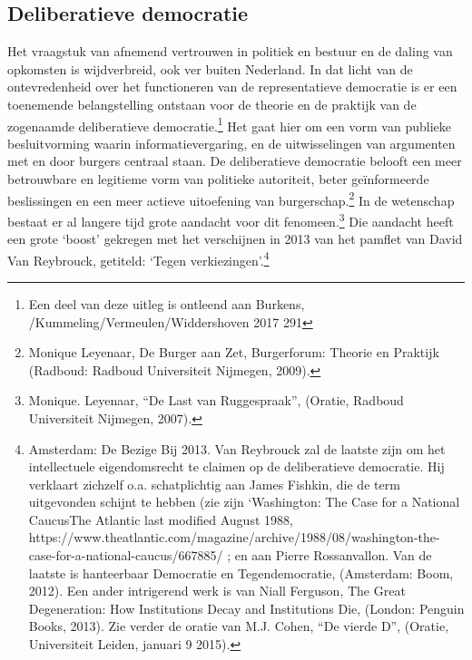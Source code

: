 \documentclass[empirical, authordate, ]{new-jote-article}
\begin{document}
	\subsection{Deliberatieve democratie}



	Het vraagstuk van afnemend vertrouwen in politiek en bestuur en de daling van opkomsten is wijdverbreid, ook ver buiten Nederland. In dat licht van de ontevredenheid over het functioneren van de representatieve democratie is er een toenemende belangstelling ontstaan voor de theorie en de praktijk van de zogenaamde deliberatieve democratie.\footnote{Een deel van deze uitleg is ontleend aan Burkens, /Kummeling/Vermeulen/Widdershoven 2017 291} Het gaat hier om een vorm van publieke besluitvorming waarin informatievergaring, en de uitwisselingen van argumenten met en door burgers centraal staan. De deliberatieve democratie belooft een meer betrouwbare en legitieme vorm van politieke autoriteit, beter geïnformeerde beslissingen en een meer actieve uitoefening van burgerschap.\footnote{Monique Leyenaar, De Burger aan Zet, Burgerforum: Theorie en Praktijk (Radboud: Radboud Universiteit Nijmegen, 2009).} In de wetenschap bestaat er al langere tijd grote aandacht voor dit fenomeen.\footnote{Monique. Leyenaar, “De Last van Ruggespraak”, (Oratie, Radboud Universiteit Nijmegen, 2007).} Die aandacht heeft een grote ‘boost' gekregen met het verschijnen in 2013 van het pamflet van David Van Reybrouck, getiteld: ‘Tegen verkiezingen'.\footnote{Amsterdam: De Bezige Bij 2013. Van Reybrouck zal de laatste zijn om het intellectuele eigendomsrecht te claimen op de deliberatieve democratie. Hij verklaart zichzelf o.a. schatplichtig aan James Fishkin, die de term uitgevonden schijnt te hebben (zie zijn ‘Washington: The Case for a National CaucusThe Atlantic last modified August 1988, https://www.theatlantic.com/magazine/archive/1988/08/washington-the-case-for-a-national-caucus/667885/ ; en aan Pierre Rossanvallon. Van de laatste is hanteerbaar Democratie en Tegendemocratie, (Amsterdam: Boom, 2012). Een ander intrigerend werk is van Niall Ferguson, The Great Degeneration: How Institutions Decay and Institutions Die, (London: Penguin Books, 2013). Zie verder de oratie van M.J. Cohen, “De vierde D”, (Oratie, Universiteit Leiden, januari 9 2015).}
\end{document}
